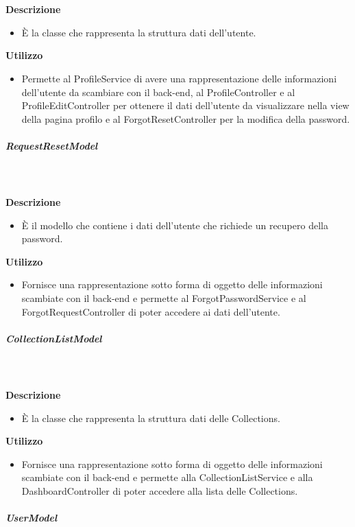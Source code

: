 				\textbf{\\ \\ Descrizione} 
					\begin{itemize}
						\item[] È la classe che rappresenta la struttura dati dell'utente.
					\end{itemize}      
				\textbf{Utilizzo}  
					\begin{itemize}
						\item[] Permette al ProfileService di avere una rappresentazione delle informazioni dell'utente da scambiare con il back-end, al ProfileController e al ProfileEditController per ottenere il dati dell'utente da visualizzare nella view della pagina profilo e al ForgotResetController per la modifica della password.
					\end{itemize}
			\subparagraph{RequestResetModel}
				
				\textbf{\\ \\ Descrizione} 
					\begin{itemize}
						\item[] È il modello che contiene i dati dell'utente che richiede un recupero della password.
					\end{itemize}      
				\textbf{Utilizzo}  
					\begin{itemize}
						\item[] Fornisce una rappresentazione sotto forma di oggetto delle informazioni scambiate con il back-end e permette al ForgotPasswordService e al ForgotRequestController di poter accedere ai dati dell'utente.
					\end{itemize}
			\subparagraph{CollectionListModel}
				
				\textbf{\\ \\ Descrizione} 
					\begin{itemize}
						\item[] È la classe che rappresenta la struttura dati delle Collections.
					\end{itemize}      
				\textbf{Utilizzo}  
					\begin{itemize}
						\item[] Fornisce una rappresentazione sotto forma di oggetto delle informazioni scambiate con il back-end e permette alla CollectionListService e alla DashboardController di poter accedere alla lista delle Collections.
					\end{itemize}
			\subparagraph{UserModel}
				
